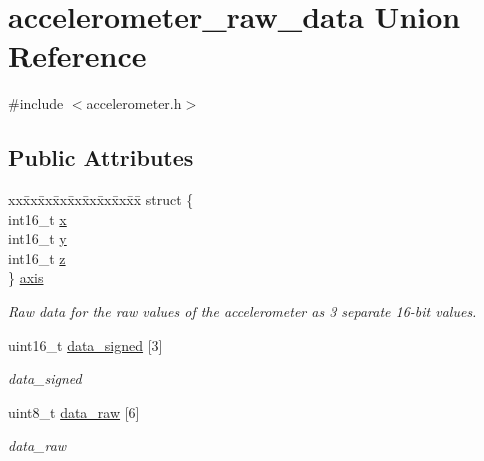 \hypertarget{unionaccelerometer__raw__data}{}\section{accelerometer\+\_\+raw\+\_\+data Union Reference}
\label{unionaccelerometer__raw__data}


{\ttfamily \#include $<$accelerometer.\+h$>$}

\subsection*{Public Attributes}
\begin{DoxyCompactItemize}
\item 
\begin{tabbing}
xx\=xx\=xx\=xx\=xx\=xx\=xx\=xx\=xx\=\kill
struct \{\\
\>int16\_t \hyperlink{unionaccelerometer__raw__data_abe5cbfe31d12ba368d2a5679b8195d5f}{x}\\
\>int16\_t \hyperlink{unionaccelerometer__raw__data_a4fd1e05861d56ec35b0562563d70e15f}{y}\\
\>int16\_t \hyperlink{unionaccelerometer__raw__data_a18caf4ddfec4b38993aae2ad5e62819e}{z}\\
\} \hyperlink{unionaccelerometer__raw__data_a308f41f8f6fe55c187825216937cc729}{axis}\\

\end{tabbing}\begin{DoxyCompactList}\small\item\em Raw data for the raw values of the accelerometer as 3 separate 16-\/bit values. \end{DoxyCompactList}\item 
uint16\+\_\+t \hyperlink{unionaccelerometer__raw__data_a0e8bfd8a99a6c123b9a3f4e766dc98e3}{data\+\_\+signed} \mbox{[}3\mbox{]}
\begin{DoxyCompactList}\small\item\em data\+\_\+signed \end{DoxyCompactList}\item 
uint8\+\_\+t \hyperlink{unionaccelerometer__raw__data_ad5506633cb7fb456ed9fccdf2cbe6e5b}{data\+\_\+raw} \mbox{[}6\mbox{]}
\begin{DoxyCompactList}\small\item\em data\+\_\+raw \end{DoxyCompactList}\end{DoxyCompactItemize}


